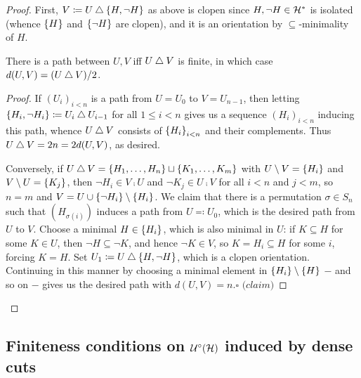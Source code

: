 \documentclass{amsart}
\begin{document}
    \begin{proof}
        First, $V\coloneqq U\bigtriangleup\left\{H,\lnot H\right\}$ as above is clopen since $H,\lnot H\in\mathcal{H}^\ast$ is isolated (whence $\left\{H\right\}$ and $\left\{\lnot H\right\}$ are clopen), and it is an orientation by $\subseteq$-minimality of $H$.
        \begin{center}
            \vspace{0.05in}
            \begin{minipage}{0.95\textwidth}
                \begin{claim*}
                    There is a path between $U,V$ iff $U\bigtriangleup V$ is finite, in which case $d(U,V)=(U\bigtriangleup V)/2$.
                \end{claim*}
                \begin{proof}
                    If $(U_i)_{i<n}$ is a path from $U=U_0$ to $V=U_{n-1}$, then letting $\left\{H_i,\lnot H_i\right\}\coloneqq U_i\bigtriangleup U_{i-1}$ for all $1\leq i<n$ gives us a sequence $(H_i)_{i<n}$ inducing this path, whence $U\bigtriangleup V$ consists of $\left\{H_i\right\}_{i<n}$ and their complements. Thus $U\bigtriangleup V=2n=2d(U,V)$, as desired.

                    \hspace{0.2in}Conversely, if $U\bigtriangleup V=\left\{H_1,\dots,H_n\right\}\sqcup\left\{K_1,\dots,K_m\right\}$ with $U\setminus V=\left\{H_i\right\}$ and $V\setminus U=\left\{K_j\right\}$, then $\lnot H_i\in V\comp U$ and $\lnot K_j\in U\comp V$ for all $i<n$ and $j<m$, so $n=m$ and $V=U\cup\left\{\lnot H_i\right\}\setminus\left\{H_i\right\}$. We claim that there is a permutation $\sigma\in S_n$ such that $(H_{\sigma(i)})$ induces a path from $U\eqqcolon U_0$, which is the desired path from $U$ to $V$. Choose a minimal $H\in\left\{H_i\right\}$, which is also minimal in $U$: if $K\subseteq H$ for some $K\in U$, then $\lnot H\subseteq\lnot K$, and hence $\lnot K\in V$, so $K=H_i\subseteq H$ for some $i$, forcing $K=H$. Set $U_1\coloneqq U\bigtriangleup\left\{H,\lnot H\right\}$, which is a clopen orientation. Continuing in this manner by choosing a minimal element in $\left\{H_i\right\}\setminus\left\{H\right\}$ $-$ and so on $-$ gives us the desired path with $d(U,V)=n$.\phantom\qedhere\hfill$\square\textit{ (claim)}$
                \end{proof}
            \end{minipage}
            \vspace{0.05in}
        \end{center}
    \end{proof}

    \subsection{Finiteness conditions on $\mathcal{U}^\circ(\mathcal{H})$ induced by dense cuts}\label{sec:finiteness_conditions_on_median_graph_dense_cuts}
\end{document}
